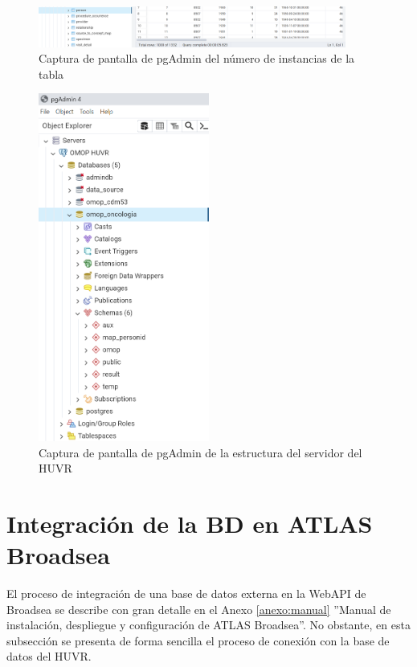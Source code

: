 \begin{figure}[H]
    \centering
    \includegraphics[width=0.90\textwidth]{figures/personCount.png}
    \caption{Captura de pantalla de pgAdmin del número de instancias de la tabla }
    \label{figure:personCount}
\end{figure}

\begin{figure}[H]
    \centering
    \includegraphics[width=0.50\textwidth]{figures/servidorHUVR.png}
    \caption{Captura de pantalla de pgAdmin de la estructura del servidor del HUVR}
    \label{figure:servidorHUVR}
\end{figure}


\section{Integración de la BD en ATLAS Broadsea}

El proceso de integración de una base de datos externa en la WebAPI de Broadsea se describe con gran detalle en el Anexo \ref{anexo:manual} ''Manual de instalación, despliegue y configuración de ATLAS Broadsea''. No obstante, en esta subsección se presenta de forma sencilla el proceso de conexión con la base de datos del HUVR.

